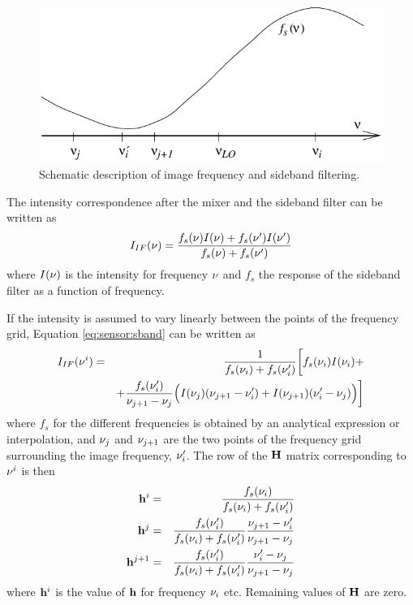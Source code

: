  \begin{figure}[tb]
  \begin{center}
    \includegraphics*[width=0.8\hsize]{Figs/sideband}
    \caption{Schematic description of image frequency and sideband filtering.}
   \label{fig:sensor:sideband} 
  \end{center} 
 \end{figure}
 
 The intensity correspondence after the mixer and the sideband filter
 can be written as
 \begin{equation}
   I_{IF}(\nu) = \frac{f_s(\nu)I(\nu)+f_s(\nu')I(\nu')}{f_s(\nu)+f_s(\nu')}
  \label{eq:sensor:sband}
 \end{equation}
 where $I(\nu)$ is the intensity for frequency $\nu$ and $f_s$ the response
 of the sideband filter as a function of frequency.

 If the intensity is assumed to vary linearly between the points of the
 frequency grid, Equation \ref{eq:sensor:sband} can be written as
 \begin{eqnarray}
   I_{IF}(\nu^i) &=& \frac{1}{f_s(\nu_i)+f_s(\nu_i')} \bigg[ f_s(\nu_i)I(\nu_i)+ \nonumber \\ 
      & & + \frac{f_s(\nu_i')}{\nu_{j+1}-\nu_j} \Big( I(\nu_j)(\nu_{j+1}-\nu_i')
           + I(\nu_{j+1})(\nu_i'-\nu_j) \Big)  \bigg]
  \label{eq:sensor:mixer}
 \end{eqnarray}
 where $f_s$ for the different frequencies is obtained by an analytical
 expression or interpolation, and $\nu_j$ and $\nu_{j+1}$ are the two points
 of the frequency grid surrounding the image frequency, $\nu_i'$. The row
 of the $\mathbf{H}$ matrix corresponding to $\nu^i$ is then
 \begin{eqnarray}
    \mathbf{h}^i &=& \frac{f_s(\nu_i)}{f_s(\nu_i)+f_s(\nu_i')}    \nonumber \\
    \mathbf{h}^j &=& \frac{f_s(\nu_i')}{f_s(\nu_i)+f_s(\nu_i')}
                  \frac{\nu_{j+1}-\nu_i'}{\nu_{j+1}-\nu_j}     \nonumber \\
    \mathbf{h}^{j+1} &=& \frac{f_s(\nu_i')}{f_s(\nu_i)+f_s(\nu_i')}
                  \frac{\nu_i'-\nu_j}{\nu_{j+1}-\nu_j}     \nonumber
 \end{eqnarray}
 where $\mathbf{h}^i$ is the value of $\mathbf{h}$ for frequency $\nu_i$ etc.
 Remaining values of $\mathbf{H}$ are zero.

